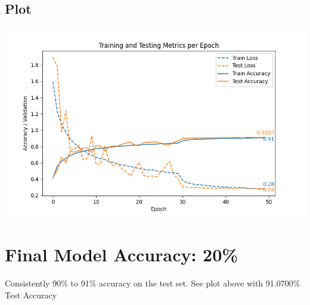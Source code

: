 \documentclass[12pt]{article}
\begin{document}
\subsection{Plot}
\vspace{-1cm}
\begin{center}
\includegraphics[width=\textwidth]{metrics.png}
\end{center}

\section{Final Model Accuracy: 20\%}
Consistently 90\% to 91\% accuracy on the test set. See plot above with 91.0700\% Test Accuracy
\end{document}
